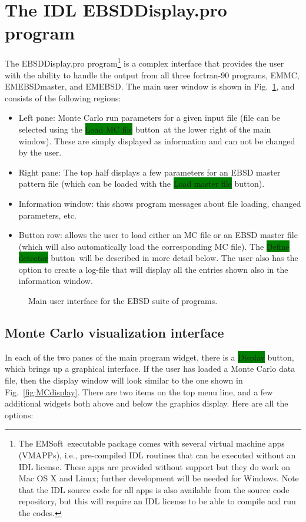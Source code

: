 \documentclass[DIV=calc, paper=letter, fontsize=11pt]{scrartcl}	 %
\newcommand{\ctp}{\textsf{EMSoft}}
\newcommand{\button}[1]{\colorbox{green}{\textsf{#1}} button}
\begin{document}
\section{The IDL \protect\textsf{EBSDDisplay.pro} program\label{sec:idl}}
The \textsf{EBSDDisplay.pro} program\footnote{The \ctp\ executable package comes with several virtual machine apps (VMAPPs), 
i.e., pre-compiled IDL routines that can be executed without an IDL license.  These apps are provided without support but they do work 
on Mac OS X and Linux; further development will be needed for Windows.  Note that the IDL source code for all apps is also available from
the source code repository, but this will require an IDL license to be able to compile and run the codes.} is a complex interface that provides the user with the ability to handle the 
output from all three fortran-90 programs, \textsf{EMMC}, \textsf{EMEBSDmaster}, and \textsf{EMEBSD}.  The main
user window is shown in Fig.~\ref{fig:EBSDmain}, and consists of the following regions:
\begin{itemize}
	\item Left pane: Monte Carlo run parameters for a given input file (file can be selected using the \button{Load MC file}\ at the lower right
	of the main window).  These are simply displayed as information and can not be changed by the user.
	\item Right pane: The top half displays a few parameters for an EBSD master pattern file (which can be loaded with the \button{Load master file}).
	\item Information window: this shows program messages about file loading, changed parameters, etc.
	\item Button row: allows the user to load either an MC file or an EBSD master file (which will also automatically load the 
	corresponding MC file).  The \button{Define detector}\ will be described in more detail below.  The user also has the option to 
	create a log-file that will display all the entries shown also in the information window.
\end{itemize}

\begin{figure}[t]
\leavevmode\centering
\epsfxsize=6in
\caption{\label{fig:EBSDmain}Main user interface for the EBSD suite of programs.}
\end{figure}

\subsection{Monte Carlo visualization interface\label{sec:idlMC}}
In each of the two panes of the main program widget, there is a \button{Display}, which brings up a graphical interface.  If the user has loaded a Monte Carlo data file, 
then the display window will look similar to the one shown in Fig.~\ref{fig:MCdisplay}.  There are two items on the top menu line, and a few additional widgets both 
above and below the graphics display.  Here are all the options:
\end{document}
